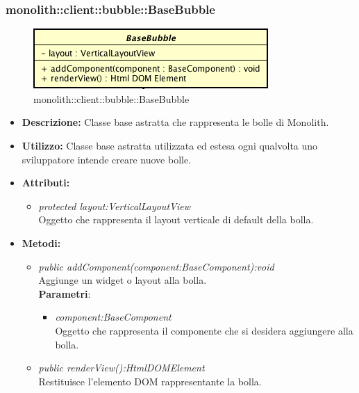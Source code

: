 \subsubsection{monolith::client::bubble::BaseBubble}

\label{monolith::client::bubble::BaseBubble}
\begin{figure}[H]
	\centering
	\includegraphics[scale=0.5]{Sezioni/SottosezioniST/img/BaseBubble.png}
	\caption{monolith::client::bubble::BaseBubble}
\end{figure}

\begin{itemize}
\item \textbf{Descrizione:} Classe base astratta che rappresenta le bolle di Monolith.
\item \textbf{Utilizzo:} Classe base astratta utilizzata ed estesa ogni qualvolta uno sviluppatore intende creare nuove bolle.
\item \textbf{Attributi:} 
\begin{itemize}
\item \textit{protected layout:VerticalLayoutView}\\
Oggetto che rappresenta il layout verticale di default della bolla.
\end{itemize}
\item \textbf{Metodi:}
\begin{itemize}
	\item \textit{public addComponent(component:BaseComponent):void}\\
Aggiunge un widget o layout alla bolla.
		  \\ \textbf{Parametri}: \begin{itemize}
				\item \textit{component:BaseComponent}\\
					Oggetto che rappresenta il componente che si desidera aggiungere alla bolla.
			\end{itemize}
	\item \textit{public renderView():HtmlDOMElement}\\
Restituisce l'elemento DOM rappresentante la bolla.
\end{itemize}
\end{itemize}

